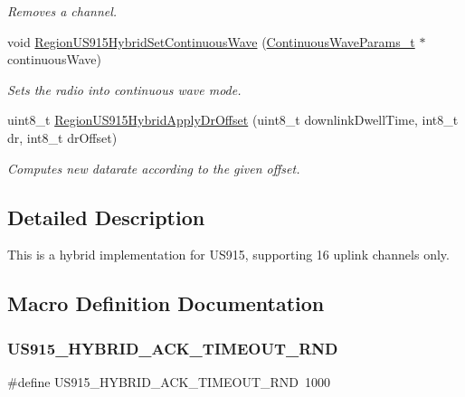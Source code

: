 \begin{DoxyCompactItemize}
\begin{DoxyCompactList}\small\item\em Removes a channel. \end{DoxyCompactList}\item 
void \hyperlink{group__REGIONUS915HYB_gad7b0e2c75aff473cd0c4287d4c6f24d1}{Region\+U\+S915\+Hybrid\+Set\+Continuous\+Wave} (\hyperlink{group__REGION_gaf39bb5ba06921139c6d17f88a8d518cd}{Continuous\+Wave\+Params\+\_\+t} $\ast$continuous\+Wave)
\begin{DoxyCompactList}\small\item\em Sets the radio into continuous wave mode. \end{DoxyCompactList}\item 
uint8\+\_\+t \hyperlink{group__REGIONUS915HYB_gaa90275764dd76f7122c3253d2eab2c2f}{Region\+U\+S915\+Hybrid\+Apply\+Dr\+Offset} (uint8\+\_\+t downlink\+Dwell\+Time, int8\+\_\+t dr, int8\+\_\+t dr\+Offset)
\begin{DoxyCompactList}\small\item\em Computes new datarate according to the given offset. \end{DoxyCompactList}\end{DoxyCompactItemize}


\subsection{Detailed Description}
This is a hybrid implementation for U\+S915, supporting 16 uplink channels only. 

\subsection{Macro Definition Documentation}
\mbox{\label{group__REGIONUS915HYB_ga559607e0b707cb0266b55efa2eb38a79}} 
\subsubsection{\texorpdfstring{U\+S915\+\_\+\+H\+Y\+B\+R\+I\+D\+\_\+\+A\+C\+K\+\_\+\+T\+I\+M\+E\+O\+U\+T\+\_\+\+R\+ND}{US915\_HYBRID\_ACK\_TIMEOUT\_RND}}
{\footnotesize\ttfamily \#define U\+S915\+\_\+\+H\+Y\+B\+R\+I\+D\+\_\+\+A\+C\+K\+\_\+\+T\+I\+M\+E\+O\+U\+T\+\_\+\+R\+ND~1000}

